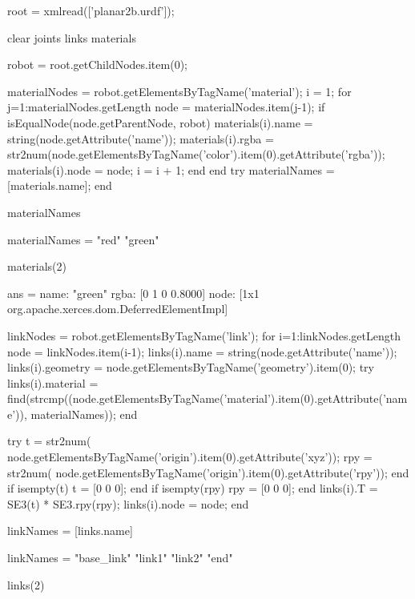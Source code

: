 \documentclass[9pt,fleqn,a4paper]{article}
\begin{document}
\begin{Code}
root = xmlread(['planar2b.urdf']);

clear joints links materials

robot = root.getChildNodes.item(0);

materialNodes = robot.getElementsByTagName('material');
i = 1;
for j=1:materialNodes.getLength
    node = materialNodes.item(j-1);
    if isEqualNode(node.getParentNode, robot)
        materials(i).name = string(node.getAttribute('name'));
        materials(i).rgba = str2num(node.getElementsByTagName('color').item(0).getAttribute('rgba'));
        materials(i).node = node;
        i = i + 1;
    end
end
try
    materialNames = [materials.name];
end

materialNames
\end{Code}
\begin{CodeGrey}
materialNames = 
    "red"    "green"
\end{CodeGrey}
\begin{Code}
materials(2)
\end{Code}
\begin{CodeGrey}
ans = 
    name: "green"
    rgba: [0 1 0 0.8000]
    node: [1x1 org.apache.xerces.dom.DeferredElementImpl]
\end{CodeGrey}
\begin{Code}

linkNodes = robot.getElementsByTagName('link');
for i=1:linkNodes.getLength
    node = linkNodes.item(i-1);
    links(i).name = string(node.getAttribute('name'));
    links(i).geometry = node.getElementsByTagName('geometry').item(0);
    try
        links(i).material = find(strcmp((node.getElementsByTagName('material').item(0).getAttribute('name')), materialNames));
    end

    try
        t = str2num( node.getElementsByTagName('origin').item(0).getAttribute('xyz'));
        rpy = str2num( node.getElementsByTagName('origin').item(0).getAttribute('rpy'));
    end
        if isempty(t)
            t = [0 0 0]; 
    end
    if isempty(rpy)
        rpy = [0 0 0];
    end
    links(i).T = SE3(t) * SE3.rpy(rpy);   
    links(i).node = node;
end

linkNames = [links.name]
\end{Code}
\begin{CodeGrey}
linkNames = 
    "base_link"    "link1"    "link2"    "end"
\end{CodeGrey}
\begin{Code}
links(2)
\end{Code}
\end{document}
